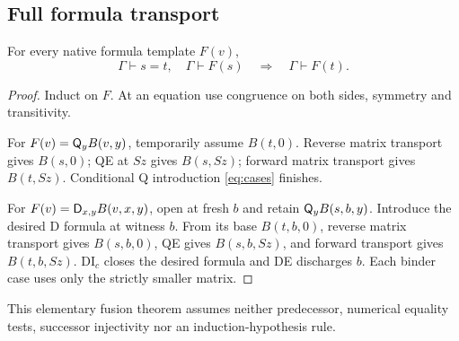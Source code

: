 \subsection{Full formula transport}
\begin{theorem}
For every native formula template $F(v)$,
\[
 \Gamma\vdash s=t,\quad\Gamma\vdash F(s)
       \quad\Longrightarrow\quad\Gamma\vdash F(t).
\]
\end{theorem}
\begin{proof}
Induct on $F$. At an equation use congruence on both sides, symmetry and
transitivity.

For $F(v)=\mathsf Q_yB(v,y)$, temporarily assume $B(t,0)$.
Reverse matrix transport gives $B(s,0)$; QE at $Sz$ gives $B(s,Sz)$;
forward matrix transport gives $B(t,Sz)$. Conditional Q introduction
\eqref{eq:cases} finishes.

For $F(v)=\mathsf D_{x,y}B(v,x,y)$, open at fresh $b$ and retain
$\mathsf Q_yB(s,b,y)$. Introduce the desired D formula at witness $b$.
From its base $B(t,b,0)$, reverse matrix transport gives $B(s,b,0)$,
QE gives $B(s,b,Sz)$, and forward transport gives $B(t,b,Sz)$.
DI$_c$ closes the desired formula and DE discharges $b$.
Each binder case uses only the strictly smaller matrix.
\end{proof}
This elementary fusion theorem assumes neither predecessor, numerical
equality tests, successor injectivity nor an induction-hypothesis rule.

